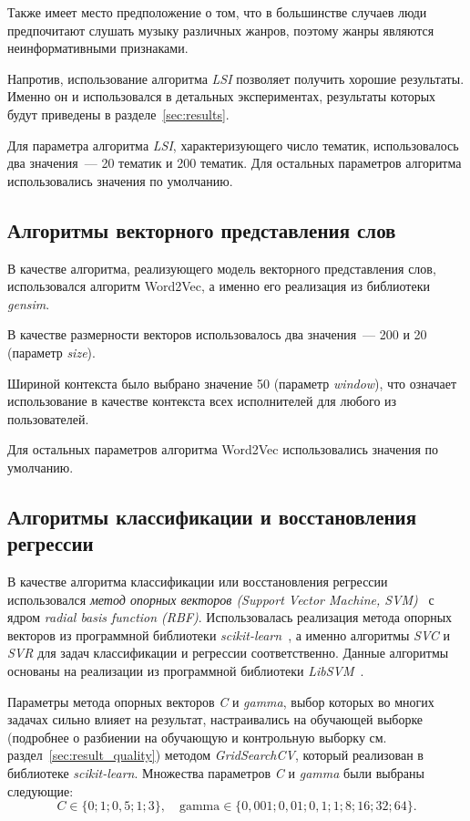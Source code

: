 Также имеет место предположение о том, что в большинстве случаев
люди предпочитают слушать музыку различных жанров, поэтому жанры
являются неинформативными признаками.

Напротив, использование алгоритма \textit{LSI} позволяет получить хорошие
результаты. Именно он и использовался в детальных экспериментах, результаты
которых будут приведены в разделе~\ref{sec:results}.

Для параметра алгоритма \textit{LSI}, характеризующего число тематик,
использовалось два значения~--- 20 тематик и 200 тематик. 
Для остальных параметров алгоритма использовались значения по умолчанию.

\subsection{Алгоритмы векторного представления слов}

В качестве алгоритма, реализующего модель векторного представления
слов, использовался алгоритм Word2Vec, а именно его реализация из
библиотеки \textit{gensim}.  

В качестве размерности векторов использовалось два значения~--- 200
и 20 (параметр \textit{size}).

Шириной контекста было выбрано значение 50 (параметр \textit{window}),
что означает использование в качестве контекста всех исполнителей для
любого из пользователей.

Для остальных параметров алгоритма Word2Vec использовались значения
по умолчанию.

\subsection{Алгоритмы классификации и восстановления регрессии}

В качестве алгоритма классификации или восстановления регрессии
использовался \textit{метод опорных векторов (Support Vector Machine,
SVM)}~\cite{cortes1995support} с ядром 
\textit{radial basis function (RBF)}. Использовалась реализация
метода опорных векторов из программной библиотеки 
\textit{scikit-learn}~\cite{sklearn}, а именно алгоритмы
\textit{SVC} и \textit{SVR} для задач классификации и регрессии
соответственно. Данные алгоритмы основаны на реализации
из программной библиотеки \textit{LibSVM}~\cite{libsvm}.

Параметры метода опорных векторов \textit{C} и \textit{gamma},
выбор которых во многих задачах сильно влияет на результат,
настраивались на обучающей выборке (подробнее о разбиении
на обучающую и контрольную выборку см.
раздел~\ref{sec:result_quality}) методом \textit{GridSearchCV},
который реализован в библиотеке \textit{scikit-learn}. Множества
параметров \textit{C} и \textit{gamma} были выбраны следующие:
\[
    C \in \{0; 1; 0{,}5; 1; 3\},\quad
    \mathrm{gamma} \in \{0{,}001; 0{,}01; 0{,}1; 1; 8; 16; 32; 64\}.
\]

